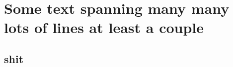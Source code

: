 \documentclass[final]{apithesis}
\begin{document}
\chapter{Some text spanning many many lots of lines at least a couple}
\lipsum[4]

\section{shit}
\end{document}
